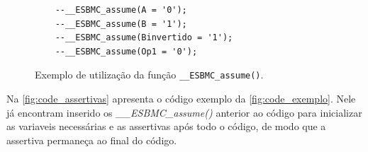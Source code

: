 \begin{figure}[H]
\caption{\label{fig:assertiva_assume} Exemplo de utilização da função \texttt{\_\_ESBMC\_assume()}.}
	\begin{center}
    \begin{minipage}{0.99\textwidth}
    \begin{lstlisting}       
    --__ESBMC_assume(A = '0');
    --__ESBMC_assume(B = '1');
    --__ESBMC_assume(Binvertido = '1');
    --__ESBMC_assume(Op1 = '0');
    \end{lstlisting}
    \end{minipage}
	\end{center}
\end{figure}

\par

\par
Na \autoref{fig:code_assertivas} apresenta o código exemplo da \autoref{fig:code_exemplo}. Nele já encontram inserido os \textit{\_\_ESBMC\_assume()} anterior ao código para inicializar as variaveis necessárias e as assertivas após todo o código, de modo que a assertiva permaneça ao final do código.

